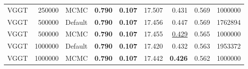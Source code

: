 \begin{table}[H]
\begin{tabular}{lrlrrrrrr}
VGGT & 250000 & MCMC & \textbf{0.790} & \textbf{0.107} & 17.507 & 0.431 & 0.569 & 1000000 \\
VGGT & 500000 & Default & \textbf{0.790} & \textbf{0.107} & 17.456 & 0.447 & 0.569 & 1762894 \\
VGGT & 500000 & MCMC & \textbf{0.790} & \textbf{0.107} & 17.455 & \underline{0.429} & 0.565 & 1000000 \\
VGGT & 1000000 & Default & \textbf{0.790} & \textbf{0.107} & 17.420 & 0.432 & 0.563 & 1953372 \\
VGGT & 1000000 & MCMC & \textbf{0.790} & \textbf{0.107} & 17.442 & \textbf{0.426} & 0.562 & 1000000 \\
\bottomrule
\end{tabular}
\end{table}
